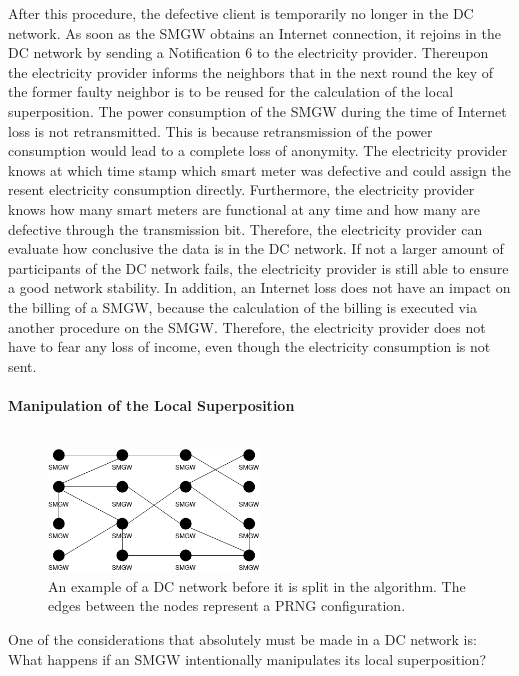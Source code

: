 After this procedure, the defective client is temporarily no longer in the DC network. As soon as the \gls{SMGW} obtains an Internet connection, it rejoins in the DC network by sending a Notification 6 to the electricity provider. Thereupon the electricity provider informs the neighbors that in the next round the key of the former faulty neighbor is to be reused for the calculation of the local superposition. The power consumption of the \gls{SMGW} during the time of Internet loss is not retransmitted. This is because retransmission of the power consumption would lead to a complete loss of anonymity. The electricity provider knows at which time stamp which smart meter was defective and could assign the resent electricity consumption directly. Furthermore, the electricity provider knows how many smart meters are functional at any time and how many are defective through the transmission bit. Therefore, the electricity provider can evaluate how conclusive the data is in the DC network. %
If not a larger amount of participants of the DC network fails, the electricity provider is still able to ensure a good network stability. %
In addition, an Internet loss does not have an impact on the billing of a \gls{SMGW}, because the calculation of the billing is executed via another procedure on the \gls{SMGW}. Therefore, the electricity provider does not have to fear any loss of income, even though the electricity consumption is not sent.\\
\\ 
\textbf{Manipulation of the Local Superposition}
\label{subsec:mani_local}
\\
\\
\begin{figure}[tbp]
  \centering
  \includegraphics[width=0.5\textwidth]{images/DC Net before Split.png}
  \caption[Example DC Network]{An example of a DC network before it is split in the algorithm. The edges between the nodes represent a PRNG configuration.}
  \label{fig:splitDCNetwork}
\end{figure}One of the considerations that absolutely must be made in a DC network is: What happens if an \gls{SMGW} intentionally manipulates its local superposition?
